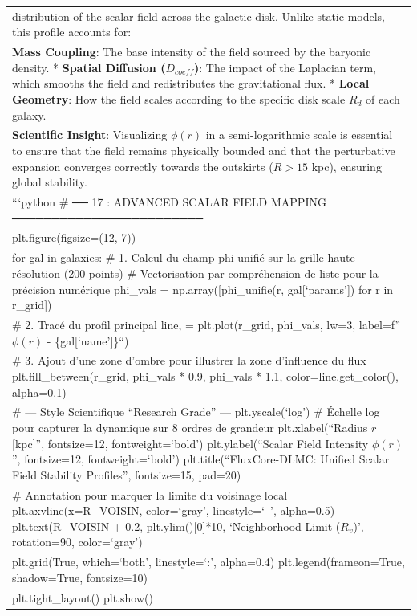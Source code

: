 \documentclass[
]{article}
\begin{document}
{\begin{longtable}[]{@{}
  >{\raggedright\arraybackslash}p{}@{}}
distribution of the scalar field across the galactic disk. Unlike static
models, this profile accounts for: \\
* \textbf{Mass Coupling}: The base intensity of the field sourced by the
baryonic density. * \textbf{Spatial Diffusion (\(D_{coeff}\))}: The
impact of the Laplacian term, which smooths the field and redistributes
the gravitational flux. * \textbf{Local Geometry}: How the field scales
according to the specific disk scale \(R_d\) of each galaxy. \\
\textbf{Scientific Insight}: Visualizing \(\phi(r)\) in a
semi-logarithmic scale is essential to ensure that the field remains
physically bounded and that the perturbative expansion converges
correctly towards the outskirts (\(R > 15\) kpc), ensuring global
stability. \\
```python \# ── 17 : ADVANCED SCALAR FIELD MAPPING
──────────────────────── \\
plt.figure(figsize=(12, 7)) \\
for gal in galaxies: \# 1. Calcul du champ phi unifié sur la grille
haute résolution (200 points) \# Vectorisation par compréhension de
liste pour la précision numérique phi\_vals = np.array({[}phi\_unifie(r,
gal{[}`params'{]}) for r in r\_grid{]}) \\
\# 2. Tracé du profil principal line, = plt.plot(r\_grid, phi\_vals,
lw=3, label=f''\(\phi(r)\) - \{gal{[}`name'{]}\}``) \\
\# 3. Ajout d'une zone d'ombre pour illustrer la zone d'influence du
flux plt.fill\_between(r\_grid, phi\_vals * 0.9, phi\_vals * 1.1,
color=line.get\_color(), alpha=0.1) \\
\# --- Style Scientifique ``Research Grade'' --- plt.yscale(`log') \#
Échelle log pour capturer la dynamique sur 8 ordres de grandeur
plt.xlabel(``Radius \(r\) {[}kpc{]}'', fontsize=12, fontweight=`bold')
plt.ylabel(``Scalar Field Intensity \(\phi(r)\)'', fontsize=12,
fontweight=`bold') plt.title(``FluxCore-DLMC: Unified Scalar Field
Stability Profiles'', fontsize=15, pad=20) \\
\# Annotation pour marquer la limite du voisinage local
plt.axvline(x=R\_VOISIN, color=`gray', linestyle=`--', alpha=0.5)
plt.text(R\_VOISIN + 0.2, plt.ylim(){[}0{]}*10, `Neighborhood Limit
(\(R_v\))', rotation=90, color=`gray') \\
plt.grid(True, which=`both', linestyle=`:', alpha=0.4)
plt.legend(frameon=True, shadow=True, fontsize=10) \\
plt.tight\_layout() plt.show() \\

\end{longtable}}
\end{document}
